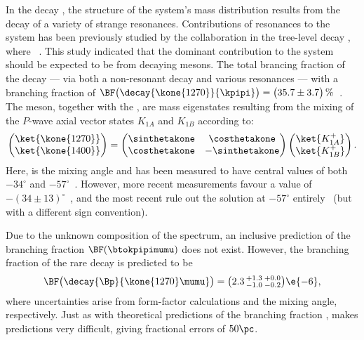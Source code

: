 In the decay \btokpipimumu, the structure of the \kpipi system's mass distribution results from the
decay of a variety of strange resonances.
Contributions of resonances to the \kpipi system has been previously studied by the \belle
collaboration in the tree-level decay \btojpsikpipi, where \jpsitomumu~\cite{Guler:2010if}.
This study indicated that the dominant contribution to the \kpipi system should be expected
to be from decaying  mesons.
The total brancing fraction of the decay 
--- via both a non-resonant decay and various resonances ---
with a branching fraction of
$\BF\big(\decay{\kone{1270}}{\kpipi}\big)=\big(35.7\pm3.7\big)\,\%$~\cite{PDG2012}.
The  meson, together with the , are mass eigenstates resulting from the
mixing of the $P$-wave axial vector states $K_{1A}$ and $K_{1B}$ according to:
\begin{equation}
  \begin{pmatrix}
    \ket{\kone{1270}} \\
    \ket{\kone{1400}}
  \end{pmatrix}
  =
  \begin{pmatrix}
    \sinthetakone & \costhetakone \\
    \costhetakone & -\sinthetakone
  \end{pmatrix}
  \begin{pmatrix}
    \ket{K_{1A}^+} \\
    \ket{K_{1B}^+}
  \end{pmatrix}.
  \label{eq:k1mixing}
\end{equation}
Here, \thetakone is the mixing angle and has been measured to have central values of both
$-34^\circ$ and
$-57^\circ$~\cite{PhysRevD.47.1252,Tayduganov:2011ui,Hatanaka:2008xj,Cheng:2011pb,Divotgey:2013jba,Cheng:2013cwa}.
However, more recent measurements favour a value of
$-(34\pm13)^\circ$~\cite{Hatanaka:2008xj,Cheng:2011pb,Divotgey:2013jba,Cheng:2013cwa},
and the most recent rule out the solution at $-57^\circ$
entirely~\cite{Divotgey:2013jba,Cheng:2013cwa}
(but with a different sign convention).

Due to the unknown composition of the \mass{\kpipi} spectrum, an inclusive prediction of the
branching fraction $\BF(\btokpipimumu)$ does not exist.
However, the branching fraction of the rare decay  is predicted to
be~\cite{Hatanaka:2008gu}
\begin{equation}
  \BF\big(\decay{\Bp}{\kone{1270}\mumu}\big) = \big(2.3\,^{+1.3}_{-1.0}\,^{+0.0}_{-0.2}\big)\e{-6},
\end{equation}
where uncertainties arise from form-factor calculations and the mixing angle, respectively.
Just as with theoretical predictions of the branching fraction \btodsphi, \QCD makes predictions
very difficult, giving fractional errors of $50\pc$.


